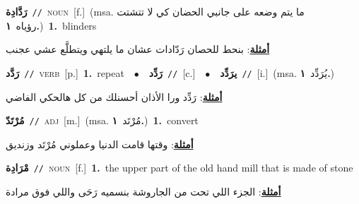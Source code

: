 \documentclass[10pt,a4paper,twoside]{article} %
\begin{document}
\begin{multicols}{2}
{\setlength\topsep{0pt}\textbf{\foreignlanguage{arabic}{رَدَّادِة}}\ {\color{gray}\texttt{//}\color{black}}\ \textsc{noun}\ [f.]\ \color{gray}(msa. \foreignlanguage{arabic}{ما يتم وضعه على جانبي الحضان كي لا تتشتت رؤياه}~\foreignlanguage{arabic}{\textbf{١.}})\color{black}\ \textbf{1.}~blinders\  \begin{flushright}\color{gray}\foreignlanguage{arabic}{\textbf{\underline{\foreignlanguage{arabic}{أمثلة}}}: بنحط للحصان رَدّادات عشان ما يلتهي ويتطلَّع عشي عجنب}\end{flushright}\color{black}} \vspace{2mm}

{\setlength\topsep{0pt}\textbf{\foreignlanguage{arabic}{رَدَّد}}\ {\color{gray}\texttt{//}\color{black}}\ \textsc{verb}\ [p.]\ \textbf{1.}~repeat\ \ $\bullet$\ \ \setlength\topsep{0pt}\textbf{\foreignlanguage{arabic}{رَدِّد}}\ {\color{gray}\texttt{//}\color{black}}\ [c.]\ \ $\bullet$\ \ \setlength\topsep{0pt}\textbf{\foreignlanguage{arabic}{يرَدِّد}}\ {\color{gray}\texttt{//}\color{black}}\ [i.]\ \color{gray}(msa. \foreignlanguage{arabic}{يُرَدِّد}~\foreignlanguage{arabic}{\textbf{١.}})\color{black}\  \begin{flushright}\color{gray}\foreignlanguage{arabic}{\textbf{\underline{\foreignlanguage{arabic}{أمثلة}}}: رَدِّد ورا الأذان أحسنلك من كل هالحكي الفاضي}\end{flushright}\color{black}} \vspace{2mm}

{\setlength\topsep{0pt}\textbf{\foreignlanguage{arabic}{مُرْتَدّ}}\ {\color{gray}\texttt{//}\color{black}}\ \textsc{adj}\ [m.]\ \color{gray}(msa. \foreignlanguage{arabic}{مُرْتَد}~\foreignlanguage{arabic}{\textbf{١.}})\color{black}\ \textbf{1.}~convert\  \begin{flushright}\color{gray}\foreignlanguage{arabic}{\textbf{\underline{\foreignlanguage{arabic}{أمثلة}}}: وقتها قامت الدنيا وعملوني مُرْتَد وزنديق}\end{flushright}\color{black}} \vspace{2mm}

{\setlength\topsep{0pt}\textbf{\foreignlanguage{arabic}{مْرَادِة}}\ {\color{gray}\texttt{//}\color{black}}\ \textsc{noun}\ [f.]\ \textbf{1.}~the upper part of the old hand mill that is made of stone\  \begin{flushright}\color{gray}\foreignlanguage{arabic}{\textbf{\underline{\foreignlanguage{arabic}{أمثلة}}}: الجزء اللي تحت من الجاروشة بنسميه رَحَى واللي فوق مرادة}\end{flushright}\color{black}} \vspace{2mm}


\end{multicols}
\end{document}
